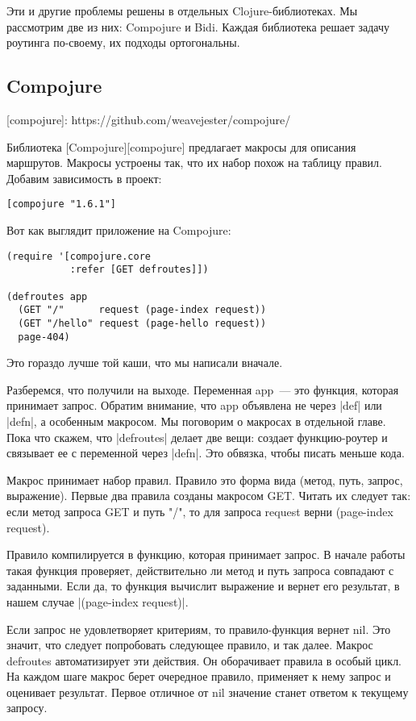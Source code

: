 Эти и другие проблемы решены в отдельных Clojure-библиотеках. Мы рассмотрим две
из них: Compojure и Bidi. Каждая библиотека решает задачу роутинга по-своему, их
подходы ортогональны.

\subsection{Compojure}

[compojure]: https://github.com/weavejester/compojure/

Библиотека [Compojure][compojure] предлагает макросы для описания
маршрутов. Макросы устроены так, что их набор похож на таблицу правил. Добавим
зависимость в проект:

\begin{verbatim}
[compojure "1.6.1"]
\end{verbatim}

Вот как выглядит приложение на Compojure:

\begin{verbatim}
(require '[compojure.core
           :refer [GET defroutes]])

(defroutes app
  (GET "/"      request (page-index request))
  (GET "/hello" request (page-hello request))
  page-404)
\end{verbatim}

Это гораздо лучше той каши, что мы написали вначале.

Разберемся, что получили на выходе. Переменная app~--- это функция, которая
принимает запрос. Обратим внимание, что app объявлена не через \spverb|def| или \spverb|defn|,
а особенным макросом. Мы поговорим о макросах в отдельной главе. Пока что
скажем, что \spverb|defroutes| делает две вещи: создает функцию-роутер и связывает ее с
переменной через \spverb|defn|. Это обвязка, чтобы писать меньше кода.

Макрос принимает набор правил. Правило это форма вида (метод, путь, запрос,
выражение). Первые два правила созданы макросом GET. Читать их следует так: если
метод запроса GET и путь "/", то для запроса request верни (page-index request).

Правило компилируется в функцию, которая принимает запрос. В начале работы такая
функция проверяет, действительно ли метод и путь запроса совпадают с
заданными. Если да, то функция вычислит выражение и вернет его результат, в
нашем случае \spverb|(page-index request)|.

Если запрос не удовлетворяет критериям, то правило-функция вернет nil. Это
значит, что следует попробовать следующее правило, и так далее. Макрос defroutes
автоматизирует эти действия. Он оборачивает правила в особый цикл. На каждом
шаге макрос берет очередное правило, применяет к нему запрос и оценивает
результат. Первое отличное от nil значение станет ответом к текущему запросу.

